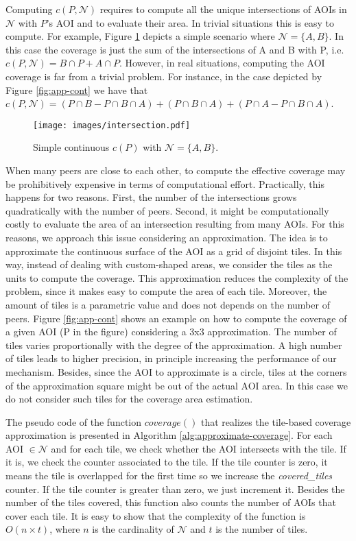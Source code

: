 \documentclass[final,10pt,a5paper]{phdimt}
\theoremstyle{definition}
\begin{document}
Computing $c(P,\mathscr{N})$ requires to compute all the unique intersections of AOIs in $\mathscr{N}$ with $P$'s AOI and to evaluate their area.
In trivial situations this is easy to compute. For example, Figure \ref{fig:simple} depicts a simple scenario where $\mathscr{N}=\{A,B\}$.
In this case the coverage is just the sum of the intersections of A and B with P, i.e. $ c(P,\mathscr{N}) = B \cap P + A \cap P$. 
However, in real situations, computing the AOI coverage is far from a trivial problem.
For instance, in the case depicted by Figure \ref{fig:app-cont} we have that $ c(P,\mathscr{N}) = (P \cap B - P \cap B \cap A) + (P \cap B \cap A) + (P \cap A - P \cap B \cap A) $.


\begin{figure}[tbh]
\centering
\texttt{[image: images/intersection.pdf]}
\caption{Simple continuous $c(P)$ with $\mathscr{N} = \{A,B\}$.}
\label{fig:simple}
\end{figure}


When many peers are close to each other, to compute the effective coverage may be prohibitively expensive in terms of computational effort. Practically, this happens for two reasons. First, the number of the intersections grows quadratically with the number of peers. Second, it might be computationally costly to evaluate the area of an intersection resulting from many AOIs. 
For this reasons, we approach this issue considering an approximation.
The idea is to approximate the continuous surface of the AOI as a grid of disjoint tiles. In this way, instead of dealing with custom-shaped areas, we consider the tiles as the units to compute the coverage. This approximation reduces the complexity of the problem, since it makes easy to compute the area of each tile.
Moreover, the amount of tiles is a parametric value and does not depends on the number of peers.
Figure \ref{fig:app-cont} shows an example on how to compute the coverage of a given AOI (P in the figure) considering a 3x3 approximation.
The number of tiles varies proportionally with the degree of the approximation. A high number of tiles leads to higher precision, in principle increasing the performance of our mechanism. Besides, since the AOI to approximate is a circle, tiles at the corners of the approximation square might be out of the actual AOI area. In this case we do not consider such tiles for the coverage area estimation.


The pseudo code of the function $coverage()$ that realizes the tile-based coverage approximation is presented in Algorithm \ref{alg:approximate-coverage}. For each AOI $\in \mathscr{N}$ and for each tile, we check whether the AOI intersects with the tile. If it is, we check the counter associated to the tile. If the tile counter is zero, it means the tile is overlapped for the first time so we increase the \textit{covered\_tiles} counter. If the tile counter is greater than zero, we just increment it. Besides the number of the tiles covered, this function also counts the number of AOIs that cover each tile. It is easy to show that the complexity of the function is $O(n \times t)$, where $n$ is the cardinality of $\mathscr{N}$ and $t$ is the number of tiles.
\end{document}
